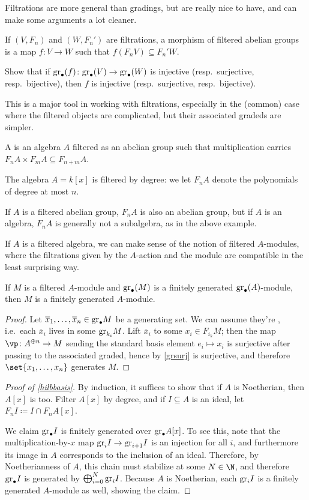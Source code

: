 Filtrations are more general than gradings, but are really nice to have, and can make some arguments a lot cleaner.
\begin{defn}
If $(V, F_n)$ and $(W, F_n')$ are filtrations, a morphism of filtered abelian groups is a map $f\colon V\to W$ such
that $f(F_nV)\subseteq F_n'W$.
\end{defn}
\begin{ex}
\label{grsurj}
Show that if $\mathrm{gr}_\bullet(f)\colon\mathrm{gr}_\bullet(V)\to\mathrm{gr}_\bullet(W)$ is injective (resp.\ surjective, resp.\
bijective), then $f$ is injective (resp.\ surjective, resp.\ bijective).
\end{ex}
This is a major tool in working with filtrations, especially in the (common) case where the filtered objects are
complicated, but their associated gradeds are simpler.
\begin{defn}
A  is an algebra $A$ filtered as an abelian group such that multiplication carries
$F_nA\times F_mA\subseteq F_{n+m}A$.
\end{defn}
\begin{exm}
The algebra $A = k[x]$ is filtered by degree: we let $F_nA$ denote the polynomials of degree at most $n$.
\end{exm}
If $A$ is a filtered abelian group, $F_nA$ is also an abelian group, but if $A$ is an algebra, $F_nA$ is generally
not a subalgebra, as in the above example.

If $A$ is a filtered algebra, we can make sense of the notion of filtered $A$-modules, where the filtrations given
by the $A$-action and the module are compatible in the least surprising way.
\begin{lem}
If $M$ is a filtered $A$-module and $\mathrm{gr}_\bullet(M)$ is a finitely generated $\mathrm{gr}_\bullet(A)$-module, then $M$ is a
finitely generated $A$-module.
\end{lem}
\begin{proof}
Let $\overline x_1,\dotsc,\overline x_n\in\mathrm{gr}_\bullet M$ be a generating set. We can assume they're
\term{homogeneous}, i.e.\ each $\overline x_i$ lives in some $\mathrm{gr}_{k_i}M$. Lift $\overline x_i$ to some $x_i\in
F_{i_k}M$; then the map $\vp\colon A^{\oplus n}\to M$ sending the standard basis element $e_i\mapsto x_i$ is
surjective after passing to the associated graded, hence by \cref{grsurj} is surjective, and therefore
$\set{x_1,\dotsc,x_n}$ generates $M$.
\end{proof}
\begin{proof}[Proof of \cref{hilbbasis}]
By induction, it suffices to show that if $A$ is Noetherian, then $A[x]$ is too. Filter $A[x]$ by degree, and if
$I\subseteq A$ is an ideal, let $F_nI\coloneqq I\cap F_nA[x]$.

We claim $\mathrm{gr}_\bullet I$ is finitely generated over $\mathrm{gr}_\bullet A[x]$. To see this, note that the
multiplication-by-$x$ map $\mathrm{gr}_i I \to\mathrm{gr}_{i + 1}I$ is an injection for all $i$, and furthermore its image in $A$
corresponds to the inclusion of an ideal. Therefore, by Noetherianness of $A$, this chain must stabilize at some $N
\in \N$, and therefore $\mathrm{gr}_\bullet I$ is generated by $\bigoplus_{i = 0}^N \mathrm{gr}_iI$. Because $A$ is Noetherian,
each $\mathrm{gr}_iI$ is a finitely generated $A$-module as well, showing the claim.  
\end{proof}
